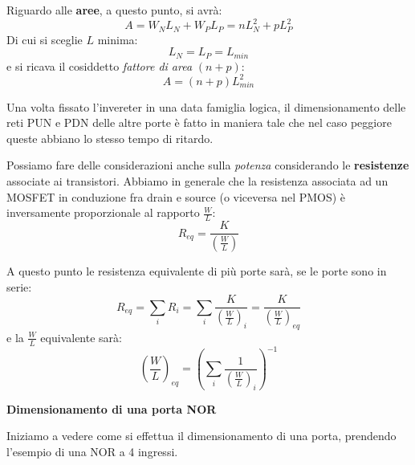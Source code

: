 \documentclass[a4paper,11pt]{article}
\begin{document}
\par\smallskip

Riguardo alle \textbf{aree}, a questo punto, si avrà:
$$
A = W_N L_N + W_P L_P = n L_N^2 + p L_P^2
$$
Di cui si sceglie $L$ minima:
$$
L_N = L_P = L_{min}
$$
e si ricava il cosiddetto \textit{fattore di area} $(n + p)$:
$$
A = (n + p) L_{min}^2
$$

Una volta fissato l'invereter in una data famiglia logica, il dimensionamento delle reti PUN e PDN delle altre porte è fatto in maniera tale che nel caso peggiore queste abbiano lo stesso tempo di ritardo.

\par\smallskip

Possiamo fare delle considerazioni anche sulla \textit{potenza} considerando le \textbf{resistenze} associate ai transistori. Abbiamo in generale che la resistenza associata ad un MOSFET in conduzione fra drain e source (o viceversa nel PMOS) è inversamente proporzionale al rapporto $\frac{W}{L}$:
$$
R_{eq} = \frac{K}{\left(\frac{W}{L}\right)}
$$

A questo punto le resistenza equivalente di più porte sarà, se le porte sono in serie:
$$
R_{eq} = \sum_i R_i = \sum_i \frac{K}{\left(\frac{W}{L}\right)_i} = \frac{K}{\left(\frac{W}{L}\right)_{eq}} 
$$
e la $\frac{W}{L}$ equivalente sarà:
$$
\left( \frac{W}{L} \right)_{eq} = \left( \sum_i \frac{1}{ \left( \frac{W}{L} \right)_i }  \right)^{-1}
$$

\par\smallskip

\noindent
\textbf{\textsf{Dimensionamento di una porta NOR}}

\noindent
Iniziamo a vedere come si effettua il dimensionamento di una porta, prendendo l'esempio di una NOR a 4 ingressi.
\end{document}
